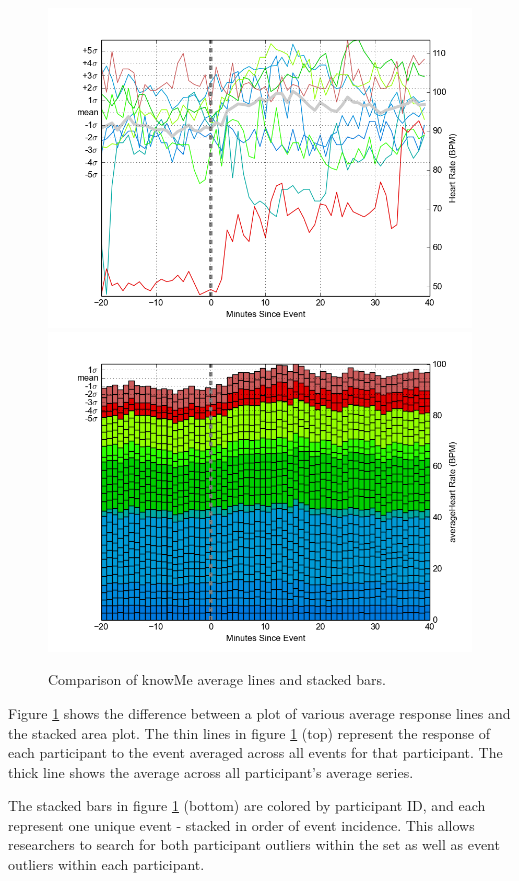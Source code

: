 \begin{figure}
\centering
\includegraphics[width=0.9\columnwidth]{./img/knowMe_60m_lines.png}
\includegraphics[width=0.9\columnwidth]{./img/knowMe_60m_bars.png}
\caption{Comparison of knowMe average lines and stacked bars.}
\label{fig:knowMeCompare}
\end{figure}

Figure \ref{fig:knowMeCompare} shows the difference between a plot of various average response lines and the stacked area plot.
The thin lines in figure \ref{fig:knowMeCompare} (top) represent the response of each participant to the event averaged across all events for that participant.
The thick line shows the average across all participant’s average series.

The stacked bars in figure \ref{fig:knowMeCompare} (bottom) are colored by participant ID, and each represent one unique event - stacked in order of event incidence.
This allows researchers to search for both participant outliers within the set as well as event outliers within each participant.

